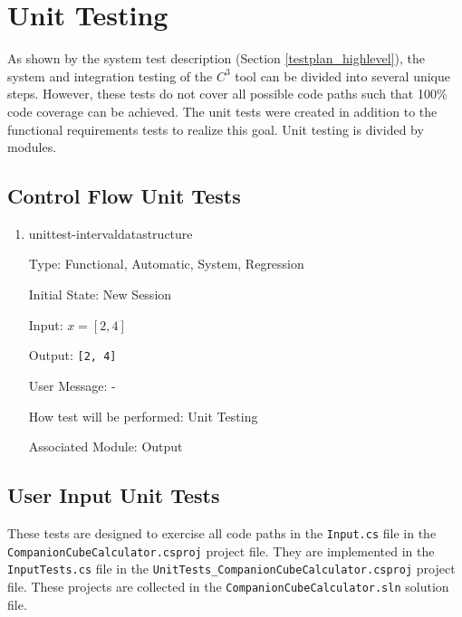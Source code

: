 \documentclass[12pt, titlepage]{article}
\newcommand{\prognameAbbrv}{$C^{3}$}
\begin{document}
\newpage				
				
\section{Unit Testing}
		
As shown by the system test description (Section \ref{testplan_highlevel}), the 
system and integration testing of the \prognameAbbrv{} tool can be divided into 
several unique steps. However, these tests do not cover all possible code paths 
such that 100\% code coverage can be achieved. The unit tests were created in 
addition to the functional requirements tests to realize this goal. Unit 
testing is divided by modules.

\subsection{Control Flow Unit Tests}

\begin{enumerate}
	
	\item{unittest-intervaldatastructure}
	
	Type: Functional, Automatic, System, Regression
	
	Initial State: New Session
	
	Input: $x = [2,4]$
	
	Output: \texttt{[2, 4]}
	
	User Message: - 
	
	How test will be performed: Unit Testing
	
	Associated Module: Output\\
	
\end{enumerate}

\subsection{User Input Unit Tests}
These tests are designed to exercise all code paths in the \texttt{Input.cs} 
file in the \texttt{CompanionCubeCalculator.csproj} project file. They are 
implemented in the \texttt{InputTests.cs} file in the 
\texttt{UnitTests\_CompanionCubeCalculator.csproj} project file. These projects 
are collected in the \texttt{CompanionCubeCalculator.sln} solution file.
\end{document}
